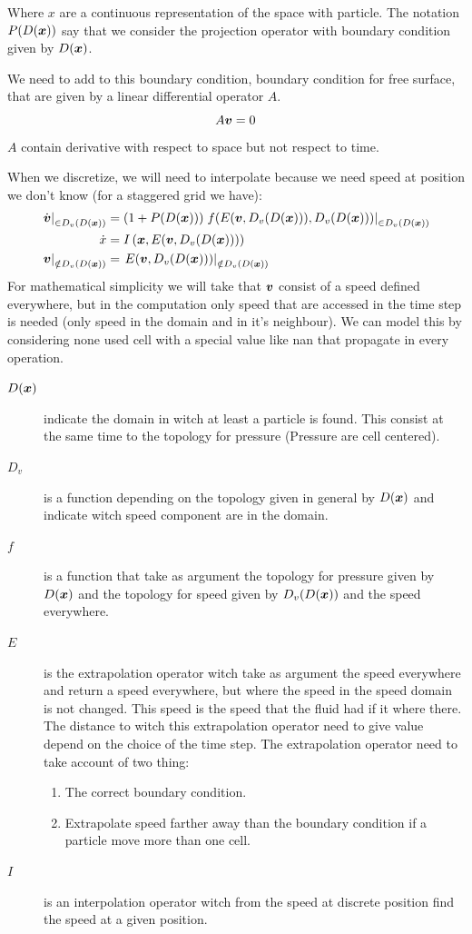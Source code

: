 Where $x$ are a continuous representation of the space with particle.
The notation $P(D({\boldsymbol {x}}))$ say that we consider the projection operator with boundary condition given by $D({\boldsymbol {x}})$.

We need to add to this boundary condition, boundary condition for free surface, that are given by a linear differential operator $A$.
\begin{equation}
	A{\boldsymbol {v}}=0
\end{equation}
$A$ contain derivative with respect to space but not respect to time.

When we discretize, we will need to interpolate because we need speed at position we don't know (for a staggered grid we have):
\begin{align*}
	\left.\dot{{\boldsymbol {v}}}\right|_{\in D_{v}(D({\boldsymbol {x}}))}&=\left(1+P(D({\boldsymbol {x}}))\right)\left.f(E({\boldsymbol {v}},D_v(D({\boldsymbol {x}}))),D_{v}(D({\boldsymbol {x}})))\right|_{\in D_{v}(D({\boldsymbol {x}}))}\\
	\dot{x}&=I\left({\boldsymbol {x}},E({\boldsymbol {v}},D_v(D({\boldsymbol {x}})))\right)\\
	\left.{\boldsymbol {v}}\right|_{\notin D_{v}(D({\boldsymbol {x}}))}&=\left.E({\boldsymbol {v}},D_v(D({\boldsymbol {x}})))\right|_{\notin D_{v}(D({\boldsymbol {x}}))}
\end{align*}
For mathematical simplicity we will take that ${\boldsymbol {v}}$ consist of a speed defined everywhere, 
but in the computation only speed that are accessed in the time step is needed (only speed in the domain and in it's neighbour).
We can model this by considering none used cell with a special value like nan that propagate in every operation.
\begin{description}
\item[$D({\boldsymbol {x}})$] indicate the domain in witch at least a particle is found. This consist at the same time to the topology for pressure (Pressure are cell centered).
\item[$D_{v}$] is a function depending on the topology given in general by $D({\boldsymbol {x}})$ and indicate witch speed component are in the domain.
\item[$f$] is a function that take as argument the topology for pressure given by $D({\boldsymbol {x}})$ and the topology for speed given by $D_v(D({\boldsymbol {x}}))$ and the speed everywhere.
\item[$E$] is the extrapolation operator witch take as argument the speed everywhere and return a speed everywhere,
but where the speed in the speed domain is not changed. This speed is the speed that the fluid had if it where there.
The distance to witch this extrapolation operator need to give value depend on the choice of the time step.
The extrapolation operator need to take account of two thing:
\begin{enumerate}
	\item The correct boundary condition.
	\item Extrapolate speed farther away than the boundary condition if a particle move more than one cell.
\end{enumerate}
\item[$I$] is an interpolation operator witch from the speed at discrete position find the speed at a given position.
\end{description}
